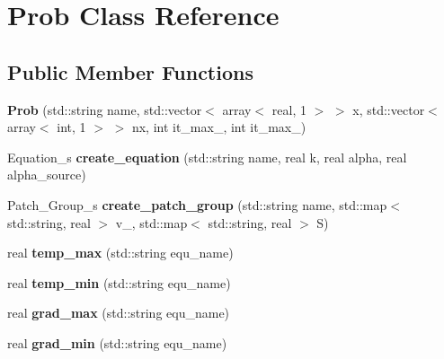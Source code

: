 \hypertarget{classProb}{\section{Prob Class Reference}
\label{classProb}
}
\subsection*{Public Member Functions}
\begin{DoxyCompactItemize}
\item 
\hypertarget{classProb_a205a24c0f08fb7e1fcd946660af2021b}{{\bfseries Prob} (std\-::string name, std\-::vector$<$ array$<$ real, 1 $>$ $>$ x, std\-::vector$<$ array$<$ int, 1 $>$ $>$ nx, int it\-\_\-max\-\_, int it\-\_\-max\-\_)}\label{classProb_a205a24c0f08fb7e1fcd946660af2021b}

\item 
\hypertarget{classProb_abde408f4e42270b369ecaaaf0323ce80}{Equation\-\_\-s {\bfseries create\-\_\-equation} (std\-::string name, real k, real alpha, real alpha\-\_\-source)}\label{classProb_abde408f4e42270b369ecaaaf0323ce80}

\item 
\hypertarget{classProb_a3cc8bff1793014e79c9f543c6b06db37}{Patch\-\_\-\-Group\-\_\-s {\bfseries create\-\_\-patch\-\_\-group} (std\-::string name, std\-::map$<$ std\-::string, real $>$ v\-\_, std\-::map$<$ std\-::string, real $>$ S)}\label{classProb_a3cc8bff1793014e79c9f543c6b06db37}

\item 
\hypertarget{classProb_a70dca1f3332e57f72b834ba91d52ca31}{real {\bfseries temp\-\_\-max} (std\-::string equ\-\_\-name)}\label{classProb_a70dca1f3332e57f72b834ba91d52ca31}

\item 
\hypertarget{classProb_ac1bce1f293f1ec1c251730db1a1d0313}{real {\bfseries temp\-\_\-min} (std\-::string equ\-\_\-name)}\label{classProb_ac1bce1f293f1ec1c251730db1a1d0313}

\item 
\hypertarget{classProb_a9fff19c6e6676c72153dc0ed32b1e6a9}{real {\bfseries grad\-\_\-max} (std\-::string equ\-\_\-name)}\label{classProb_a9fff19c6e6676c72153dc0ed32b1e6a9}

\item 
\hypertarget{classProb_a6dc764bdb12b430c1a28d73925f6c6d8}{real {\bfseries grad\-\_\-min} (std\-::string equ\-\_\-name)}\label{classProb_a6dc764bdb12b430c1a28d73925f6c6d8}


\end{DoxyCompactItemize}
